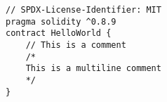 \begin{lstlisting}[language=Solidity]
// SPDX-License-Identifier: MIT
pragma solidity ^0.8.9
contract HelloWorld {
	// This is a comment
	/* 
	This is a multiline comment
	*/	
}
\end{lstlisting}